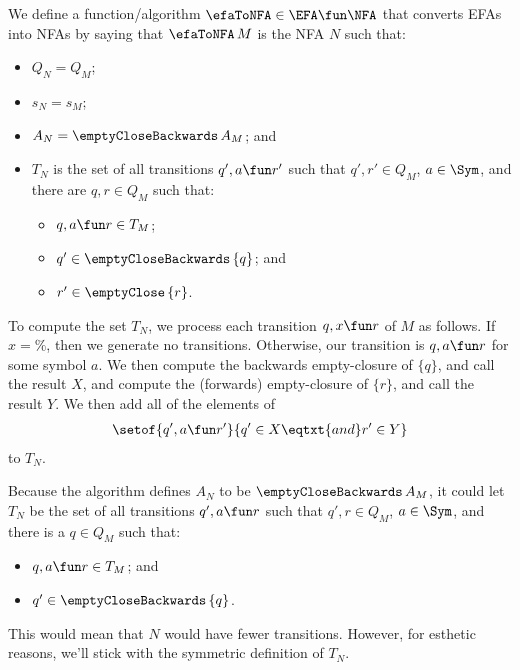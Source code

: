 We define a function/algorithm $\efaToNFA\in\EFA\fun\NFA$ that
converts EFAs into NFAs by saying that $\efaToNFA\,M$ is the NFA $N$
such that:
\begin{itemize}
\item $Q_N=Q_M$;

\item $s_N=s_M$;

\item $A_N=\emptyCloseBackwards\,A_M$; and

\item $T_N$ is the set of all transitions $q', a\fun r'$ such that
  $q',r'\in Q_M$, $a\in\Sym$, and there are $q,r\in Q_M$ such that:
\begin{itemize}
\item $q,a\fun r\in T_M$;
\item $q'\in{\emptyCloseBackwards\,\{q\}}$; and
\item $r'\in{\emptyClose\,\{r\}}$.
\end{itemize}
\end{itemize}

To compute the set $T_N$, we process each transition $q,x\fun r$ of
$M$ as follows.  If $x=\%$, then we generate no transitions.
Otherwise, our transition is $q, a\fun r$ for some symbol $a$.  We
then compute the backwards empty-closure of $\{q\}$, and call the
result $X$, and compute the (forwards) empty-closure of $\{r\}$, and
call the result $Y$.  We then add all of the elements of
\begin{gather*}
\setof{q', a\fun r'}{q'\in X\eqtxt{and}r'\in Y}
\end{gather*}
to $T_N$.

Because the algorithm defines $A_N$ to be $\emptyCloseBackwards\,A_M$,
it could let $T_N$ be the set of all transitions $q',a\fun r$
such that $q',r\in Q_M$, $a\in\Sym$, and there is a $q\in Q_M$ such
that:
\begin{itemize}
\item $q,a\fun r\in T_M$; and
\item $q'\in{\emptyCloseBackwards\,\{q\}}$.
\end{itemize}
This would mean that $N$ would have fewer transitions.  However, for
esthetic reasons, we'll stick with the symmetric definition of $T_N$.

